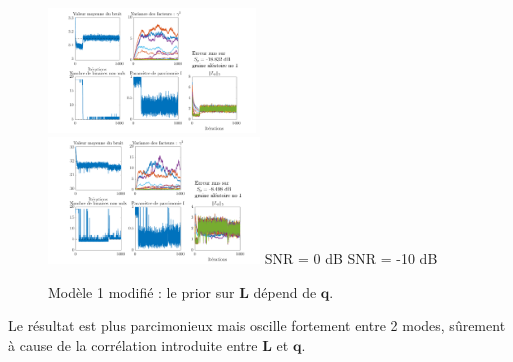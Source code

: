 \documentclass[ 12pt]{article}
\begin{document}
\hspace{-3cm}\begin{minipage}{1.4\textwidth}
	\begin{figure}[H]
		\centering
		\includegraphics[width=0.49\textwidth]{ToyCase/modele2_varL1surlq.png}			\includegraphics[width=0.5\textwidth]{ToyCase/modele2_varL1surlq_snrm10db.png}	
		SNR = 0 dB \hspace{0.5\textwidth} SNR = -10 dB
		\caption{Modèle 1 modifié : le prior sur $\bm{L}$ dépend de $\bm{q}$.}
	\end{figure}
\end{minipage}
Le résultat est plus parcimonieux mais oscille fortement entre 2 modes, sûrement à cause de la corrélation introduite entre $\bm{L}$ et $\bm{q}$.\\
\end{document}
